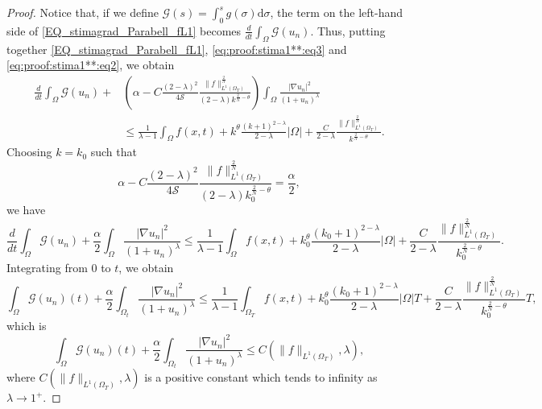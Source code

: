 \documentclass{amsart}
\numberwithin{equation}{section}
\def\elleomT#1{L^{#1}(\Omega_T)}
\def\io{\int_\Omega}
\def\iot{\int_{\Omega_t}}
\def\ioT{\int_{\Omega_T}}
\def\norma#1#2{ \|#1 \|_{#2}}
\newcommand{\abs}[1]{\left|#1\right|}
\begin{document}
\begin{proof}
    Notice that, if we define $\mathcal{G}(s)=\int_0^s g(\sigma)\mathrm{d}\sigma$, the term on the left-hand side of \eqref{EQ_stimagrad_Parabell_fL1} becomes $\frac{d}{dt}\io \mathcal{G}(u_n)$. Thus, putting together \eqref{EQ_stimagrad_Parabell_fL1}, \eqref{eq:proof:stima1**:eq3} and \eqref{eq:proof:stima1**:eq2}, we obtain
    \begin{equation}
    \begin{split}
    \frac{d}{dt}\io \mathcal{G}(u_n) +
    &\left(\alpha -C \frac{(2-\lambda)^2}{4\mathcal{S}}\frac{\norma{f}{\elleomT1}^{\frac{2}{N}}}{(2-\lambda) k^{\frac{2}{N}-\theta}}\right)
    \io \frac{\left|\nabla u_n\right|^2}{\left(1+u_n\right)^\lambda} \\
    & \leq 
    \frac{1}{\lambda-1}\io f(x,t) +
    k^{\theta}\frac{(k+1)^{2-\lambda}}{2-\lambda}\abs{\Omega}
    +\frac{C}{2-\lambda} \frac{\norma{f}{\elleomT 1} ^{\frac{2}{N}}}{k^{\frac{2}{N}-\theta}} .
    \end{split}
    \end{equation}
    Choosing $k=k_0$ such that 
    $$\alpha -C \frac{(2-\lambda)^2}{4\mathcal{S}}\frac{\norma{f}{\elleomT1}^{\frac{2}{N}}}{(2-\lambda) k_0^{\frac{2}{N}-\theta}}=\frac{\alpha}{2},$$
    we have
    $$\frac{d}{dt}\io \mathcal{G}(u_n) +
    \frac{\alpha}{2}\io \frac{\left|\nabla u_n\right|^2}{\left(1+u_n\right)^\lambda}
    \leq 
    \frac{1}{\lambda-1}\io f(x,t) +
    k_0^{\theta}\frac{(k_0+1)^{2-\lambda}}{2-\lambda}\abs{\Omega}
    +\frac{C}{2-\lambda} \frac{\norma{f}{\elleomT 1} ^{\frac{2}{N}}}{k_0^{\frac{2}{N}-\theta}} .
    $$
    Integrating from $0$ to $t$, we obtain
    $$\io \mathcal{G}(u_n)(t) +
    \frac{\alpha}{2}\iot \frac{\left|\nabla u_n\right|^2}{\left(1+u_n\right)^\lambda}
    \leq 
    \frac{1}{\lambda-1}\ioT f(x,t) +
    k_0^{\theta}\frac{(k_0+1)^{2-\lambda}}{2-\lambda}\abs{\Omega}T
    +\frac{C}{2-\lambda} \frac{\norma{f}{\elleomT 1} ^{\frac{2}{N}}}{k_0^{\frac{2}{N}-\theta}}T,
    $$
    which is
    \begin{equation}\label{eq:proof:stima1**:eq3.5}
        \io \mathcal{G}(u_n)(t) +
    \frac{\alpha}{2}\iot \frac{\left|\nabla u_n\right|^2}{\left(1+u_n\right)^\lambda}
    \leq C\left(\|f\|_{L^1(\Omega_T)}, \lambda\right),
    \end{equation}
    where $C\left(\|f\|_{L^1(\Omega_T)},\lambda\right)$ is a positive constant which tends to infinity as $\lambda\to1^+$.


\end{proof}
\end{document}
